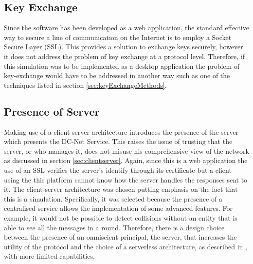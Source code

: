 \subsection{Key Exchange}
Since the software has been developed as a web application, the standard effective way to secure a line of communication on the Internet is to employ a Socket Secure Layer (SSL). This provides a solution to exchange keys securely, however it does not address the problem of key exchange at a protocol level. Therefore, if this simulation was to be implemented as a desktop application the problem of key-exchange would have to be addressed in another way such as one of the techniques listed in section \ref{sec:keyExchangeMethods}.

\subsection{Presence of Server}
Making use of a client-server architecture introduces the presence of the server which presents the DC-Net Service. This raises the issue of trusting that the server, or who manages it, does not misuse his comprehensive view of the network as discussed in section \ref{sec:clientserver}. Again, since this is a web application the use of an SSL verifies the server's identify through its certificate but a client using the this platform cannot know how the server handles the responses sent to it. The client-server architecture was chosen putting emphasis on the fact that this is a simulation. Specifically, it was selected because the presence of a centralised service allows the implementation of some advanced features. For example, it would not be possible to detect collisions without an entity that is able to see all the messages in a round. Therefore, there is a design choice between the presence of an omniscient principal, the server, that increases the utility of the protocol and the choice of a serverless architecture, as described in \cite{Scholz}, with more limited capabilities.



